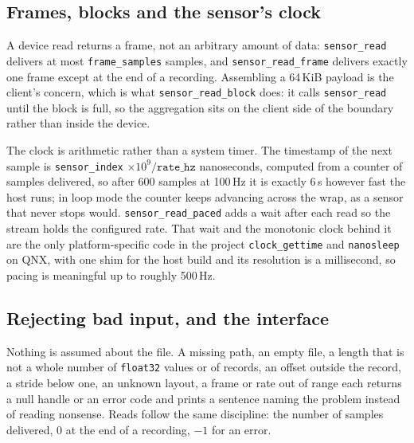 \documentclass[12pt,a4paper,oneside]{report}
\begin{document}
\subsection{Frames, blocks and the sensor's clock}

A device read returns a frame, not an arbitrary amount of data:
\texttt{sensor\_read} delivers at most \texttt{frame\_samples} samples, and
\texttt{sensor\_read\_frame} delivers exactly one frame except at the end of a
recording. Assembling a 64\,KiB payload is the client's concern, which is what
\texttt{sensor\_read\_block} does: it calls \texttt{sensor\_read} until the block
is full, so the aggregation sits on the client side of the boundary rather than
inside the device.

The clock is arithmetic rather than a system timer. The timestamp of the next
sample is \texttt{sensor\_index} $\times 10^9 / \texttt{rate\_hz}$ nanoseconds,
computed from a counter of samples delivered, so after 600 samples at 100\,Hz it
is exactly 6\,s however fast the host runs; in loop mode the counter keeps
advancing across the wrap, as a sensor that never stops would.
\texttt{sensor\_read\_paced} adds a wait after each read so the stream holds the
configured rate. That wait and the monotonic clock behind it are the only
platform-specific code in the project  \texttt{clock\_gettime} and
\texttt{nanosleep} on QNX, with one shim for the host build  and its resolution
is a millisecond, so pacing is meaningful up to roughly 500\,Hz.

\subsection{Rejecting bad input, and the interface}

Nothing is assumed about the file. A missing path, an empty file, a length that is
not a whole number of \texttt{float32} values or of records, an offset outside the
record, a stride below one, an unknown layout, a frame or rate out of range 
each returns a null handle or an error code and prints a sentence naming the
problem instead of reading nonsense. Reads follow the same discipline: the number
of samples delivered, 0 at the end of a recording, $-1$ for an error.
\end{document}
